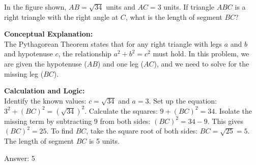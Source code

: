 \documentclass[11pt,paper=a4,answers]{exam}
\begin{document}
\begin{questions}
\pointsinrightmargin
\pointsdroppedatright
\marksnotpoints
{}
\pointformat{\boldmath\themarginpoints}
\bracketedpoints



\question
\begin{center}
\end{center}
In the figure shown, $AB = \sqrt{34}$ units and $AC = 3$ units. If triangle $ABC$ is a right triangle with the right angle at $C$, what is the length of segment $BC$?

\begin{solution}
\textbf{Conceptual Explanation:} \\
The Pythagorean Theorem states that for any right triangle with legs $a$ and $b$ and hypotenuse $c$, the relationship $a^2 + b^2 = c^2$ must hold. In this problem, we are given the hypotenuse ($AB$) and one leg ($AC$), and we need to solve for the missing leg ($BC$).

\vspace{30pt}

\textbf{Calculation and Logic:} \\
Identify the known values: $c = \sqrt{34}$ and $a = 3$. Set up the equation: $3^2 + (BC)^2 = (\sqrt{34})^2$. Calculate the squares: $9 + (BC)^2 = 34$. Isolate the missing term by subtracting 9 from both sides: $(BC)^2 = 34 - 9$. This gives $(BC)^2 = 25$. To find $BC$, take the square root of both sides: $BC = \sqrt{25} = 5$. The length of segment $BC$ is 5 units.

\vspace{30pt}

Answer: \colorbox{yellow!100}{5}
\end{solution}

\vspace{60pt}


\end{questions}
\end{document}
